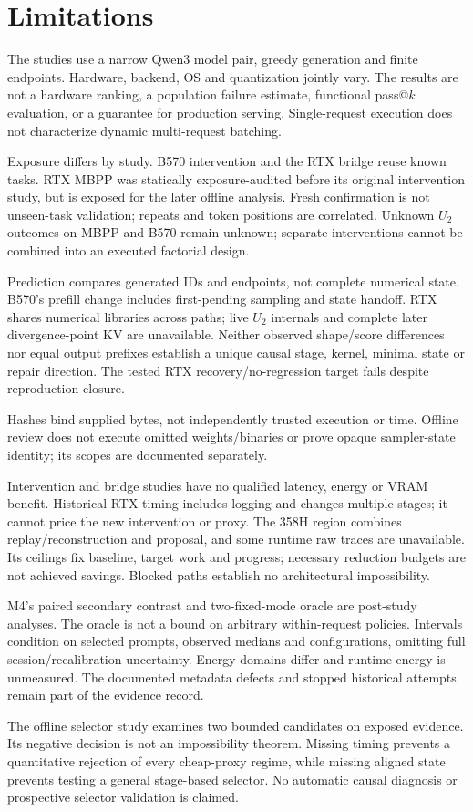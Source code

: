 \section{Limitations}
\label{sec:limitations}
The studies use a narrow Qwen3 model pair, greedy generation and finite endpoints. Hardware, backend, OS and quantization jointly vary. The results are not a hardware ranking, a population failure estimate, functional pass@$k$ evaluation, or a guarantee for production serving. Single-request execution does not characterize dynamic multi-request batching.

Exposure differs by study. B570 intervention and the RTX bridge reuse known tasks. RTX MBPP was statically exposure-audited before its original intervention study, but is exposed for the later offline analysis. Fresh confirmation is not unseen-task validation; repeats and token positions are correlated. Unknown $U_2$ outcomes on MBPP and B570 remain unknown; separate interventions cannot be combined into an executed factorial design.

Prediction compares generated IDs and endpoints, not complete numerical state. B570's prefill change includes first-pending sampling and state handoff. RTX shares numerical libraries across paths; live $U_2$ internals and complete later divergence-point KV are unavailable. Neither observed shape/score differences nor equal output prefixes establish a unique causal stage, kernel, minimal state or repair direction. The tested RTX recovery/no-regression target fails despite reproduction closure.

Hashes bind supplied bytes, not independently trusted execution or time. Offline review does not execute omitted weights/binaries or prove opaque sampler-state identity; its scopes are documented separately.

Intervention and bridge studies have no qualified latency, energy or VRAM benefit. Historical RTX timing includes logging and changes multiple stages; it cannot price the new intervention or proxy. The 358H region combines replay/reconstruction and proposal, and some runtime raw traces are unavailable. Its ceilings fix baseline, target work and progress; necessary reduction budgets are not achieved savings. Blocked paths establish no architectural impossibility.

M4's paired secondary contrast and two-fixed-mode oracle are post-study analyses. The oracle is not a bound on arbitrary within-request policies. Intervals condition on selected prompts, observed medians and configurations, omitting full session/recalibration uncertainty. Energy domains differ and runtime energy is unmeasured. The documented metadata defects and stopped historical attempts remain part of the evidence record.

The offline selector study examines two bounded candidates on exposed evidence. Its negative decision is not an impossibility theorem. Missing timing prevents a quantitative rejection of every cheap-proxy regime, while missing aligned state prevents testing a general stage-based selector. No automatic causal diagnosis or prospective selector validation is claimed.
